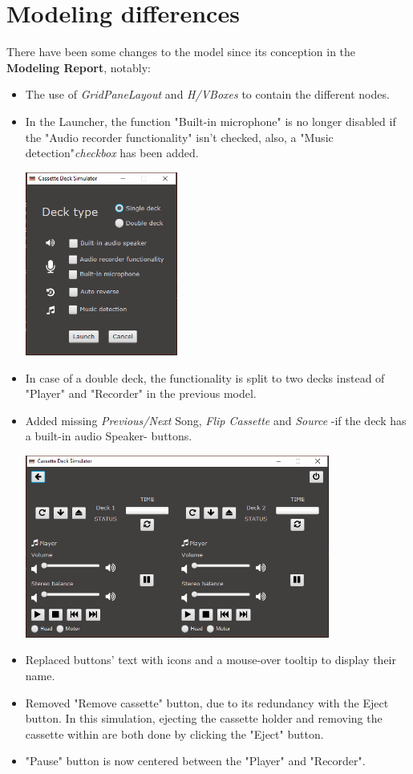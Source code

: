 \documentclass[11pt]{article}
\begin{document}
\section{Modeling differences}
There have been some changes to the model since its conception in the \textbf{Modeling Report}, notably:
\begin{itemize}
\item The use of \textit{GridPaneLayout} and \textit{H/VBoxes }to contain the different nodes.
\item In the Launcher, the function "Built-in microphone" is no longer disabled if the "Audio recorder functionality" isn't checked, also, a "Music detection"\textit{checkbox} has been added.
\begin{center}
\includegraphics[width=5cm]{./img/deckLauncher.png}\\
\end{center}
\item  In case of a double deck, the functionality is split to two decks instead of "Player" and "Recorder" in the previous model.
\item Added missing \textit{Previous/Next} Song, \textit{Flip Cassette} and \textit{Source} -if the deck has a built-in audio Speaker- buttons.
\begin{center}
\includegraphics[width=10cm]{./img/doubleDeck_noF.png}\\
\end{center}
\item Replaced buttons' text with icons and a mouse-over tooltip to display their name.
\item Removed "Remove cassette" button, due to its redundancy with the Eject button. In this simulation, ejecting the cassette holder and removing the cassette within are both done by clicking the "Eject" button.
\item "Pause" button is now centered between the "Player" and "Recorder".

\end{itemize}
\end{document}
